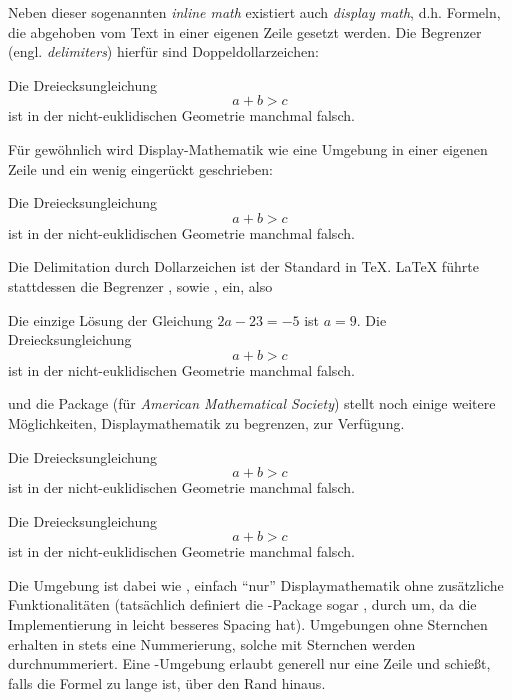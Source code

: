 Neben dieser sogenannten \emph{inline math} existiert auch \emph{display math}, d.h. Formeln, die abgehoben vom Text in einer eigenen Zeile gesetzt werden.
Die Begrenzer (engl. \emph{delimiters}) hierfür sind Doppeldollarzeichen:
\begin{latexlisting}
	Die Dreiecksungleichung $$a + b > c$$ ist in der nicht-euklidischen Geometrie manchmal falsch.
\end{latexlisting}
Für gewöhnlich wird Display-Mathematik wie eine Umgebung in einer eigenen Zeile und ein wenig eingerückt geschrieben:
\begin{latexlisting}
	Die Dreiecksungleichung
	$$
		a + b > c
	$$
	ist in der nicht-euklidischen Geometrie manchmal falsch.
\end{latexlisting}
Die Delimitation durch Dollarzeichen ist der Standard in \TeX{}.
\LaTeX{} führte stattdessen die Begrenzer \latexcommand{(}, \latexcommand{)} sowie \latexcommand{[}, \latexcommand{]} ein, also
\begin{latexlisting}
	Die einzige Lösung der Gleichung \(2a - 23 = -5\) ist \(a = 9\).
	Die Dreiecksungleichung
	\[
		a + b > c
	\]
	ist in der nicht-euklidischen Geometrie manchmal falsch.
\end{latexlisting}
und die Package  (für \emph{American Mathematical Society}) stellt noch einige weitere Möglichkeiten, Displaymathematik zu begrenzen, zur Verfügung.
\begin{latexlisting}
	Die Dreiecksungleichung
	\begin{equation}
		a + b > c
	\end{equation}
	ist in der nicht-euklidischen Geometrie manchmal falsch.

	Die Dreiecksungleichung
	\begin{equation*}
		a + b > c
	\end{equation*}
	ist in der nicht-euklidischen Geometrie manchmal falsch.
\end{latexlisting}
Die Umgebung  ist dabei wie \latexcommand{[}, \latexcommand{]} einfach \enquote{nur} Displaymathematik ohne zusätzliche Funktionalitäten (tatsächlich definiert die -Package sogar \latexcommand{[}, \latexcommand{]} durch  um, da die Implementierung in  leicht besseres Spacing hat).
Umgebungen ohne Sternchen erhalten in  stets eine Nummerierung, solche mit Sternchen werden durchnummeriert.
Eine -Umgebung erlaubt generell nur eine Zeile und schießt, falls die Formel zu lange ist, über den Rand hinaus.
